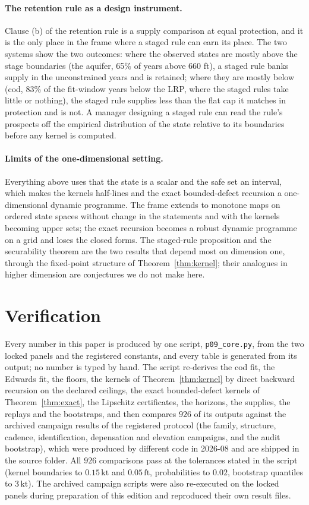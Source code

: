 \documentclass[11pt,a4paper]{article}
\theoremstyle{plain}
\theoremstyle{definition}
\theoremstyle{remark}
\newcommand{\kt}{\,\mathrm{kt}}
\newcommand{\ft}{\,\mathrm{ft}}
\begin{document}
\paragraph{The retention rule as a design instrument.}
Clause (b) of the retention rule is a supply comparison at equal protection, and it is the only place in the frame where a staged rule can earn its place. The two systems show the two outcomes: where the observed states are mostly above the stage boundaries (the aquifer, 65\% of years above 660 ft), a staged rule banks supply in the unconstrained years and is retained; where they are mostly below (cod, 83\% of the fit-window years below the LRP, where the staged rules take little or nothing), the staged rule supplies less than the flat cap it matches in protection and is not. A manager designing a staged rule can read the rule's prospects off the empirical distribution of the state relative to its boundaries before any kernel is computed.

\paragraph{Limits of the one-dimensional setting.}
Everything above uses that the state is a scalar and the safe set an interval, which makes the kernels half-lines and the exact bounded-defect recursion a one-dimensional dynamic programme. The frame extends to monotone maps on ordered state spaces without change in the statements and with the kernels becoming upper sets; the exact recursion becomes a robust dynamic programme on a grid and loses the closed forms. The staged-rule proposition and the securability theorem are the two results that depend most on dimension one, through the fixed-point structure of Theorem~\ref{thm:kernel}; their analogues in higher dimension are conjectures we do not make here.

\section{Verification}\label{sec:verification}

Every number in this paper is produced by one script, \texttt{p09\_core.py}, from the two locked panels and the registered constants, and every table is generated from its output; no number is typed by hand. The script re-derives the cod fit, the Edwards fit, the floors, the kernels of Theorem~\ref{thm:kernel} by direct backward recursion on the declared ceilings, the exact bounded-defect kernels of Theorem~\ref{thm:exact}, the Lipschitz certificates, the horizons, the supplies, the replays and the bootstraps, and then compares $926$ of its outputs against the archived campaign results of the registered protocol (the family, structure, cadence, identification, depensation and elevation campaigns, and the audit bootstrap), which were produced by different code in 2026-08 and are shipped in the source folder. All $926$ comparisons pass at the tolerances stated in the script (kernel boundaries to $0.15\kt$ and $0.05\ft$, probabilities to $0.02$, bootstrap quantiles to $3\kt$). The archived campaign scripts were also re-executed on the locked panels during preparation of this edition and reproduced their own result files.
\end{document}
